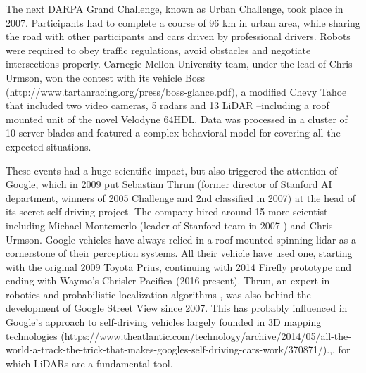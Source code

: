 The next DARPA Grand Challenge, known as Urban Challenge, took place in 2007.
Participants had to complete a course of 96 km in urban area, while sharing the
road with other participants and cars driven by professional drivers. Robots
were required to obey traffic regulations, avoid obstacles and negotiate 
intersections properly. Carnegie Mellon University team, under the lead of
Chris Urmson, won the contest with 
its vehicle Boss (http://www.tartanracing.org/press/boss-glance.pdf), a 
modified Chevy Tahoe that included two video cameras, 
5 radars and 13 LiDAR --including a roof mounted unit of the novel Velodyne
64HDL. Data was processed in a cluster of 10 server blades and featured
a complex behavioral model \cite{Urmson2007} for covering all the expected
situations.

These events had a huge scientific impact, but also triggered the attention of
Google, which in 2009 put Sebastian Thrun (former director of Stanford AI 
department, winners of 2005 Challenge and 2nd classified in 2007) at the 
head of its secret self-driving project. 
The company hired around 15 more scientist including Michael Montemerlo 
\cite{Montemerlo2003a} (leader of Stanford team in 2007 \cite{Montemerlo2008}) 
and Chris Urmson.
Google vehicles have always relied in a roof-mounted spinning lidar as 
a cornerstone of their perception systems. All their vehicle have used one, 
starting with the original 2009 Toyota Prius, continuing with 2014 Firefly
prototype and ending with Waymo's Chrisler Pacifica (2016-present).
Thrun, an expert in robotics and probabilistic localization algorithms
\cite{Levinson2011}, 
was also behind the development of Google Street View since 2007. 
This has probably influenced in Google's approach to self-driving vehicles 
largely founded in 3D mapping technologies 
(https://www.theatlantic.com/technology/archive/2014/05/all-the-world-a-track-the-trick-that-makes-googles-self-driving-cars-work/370871/).,,
 for which LiDARs are a fundamental tool.
 
